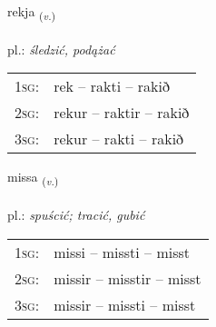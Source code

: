 \documentclass[frontgrid, backgrid]{flacards}\usepackage[]{graphicx}\usepackage[]{xcolor}
\begin{document}
\renewcommand{\flhead}{\vskip5pt \fboxsep=0pt {\small\bfseries\footnotesize Sagnorð | Verb}}
\renewcommand{\fcfoot}{\vskip5pt \fboxsep=0pt \hspace{2pt}{\small\bfseries\footnotesize 1K}}

\renewcommand{\blhead}{\vskip5pt {\small\bfseries\footnotesize Sagnorð | Verb }}
\renewcommand{\bcfoot}{\vskip5pt \hspace{2pt}{\small\bfseries\footnotesize 1K}}


{rekja \small{\textsubscript{(\textit{v.})}} \\[1ex] %
\textphonetic{[rɛːca]} \\
pl.: \emph{śledzić, podążać} \\  [2ex]
\renewcommand*{\arraystretch}{0.8}
\begin{tabular}{p{1cm}l}
\textsc{1sg}: & rek -- rakti -- rakið \\ 
\textsc{2sg}: & rekur -- raktir -- rakið \\ 
\textsc{3sg}: & rekur -- rakti -- rakið \\ 
\end{tabular}
}

\renewcommand{\flhead}{\vskip5pt \fboxsep=0pt {\small\bfseries\footnotesize Sagnorð | Verb}}
\renewcommand{\fcfoot}{\vskip5pt \fboxsep=0pt \hspace{2pt}{\small\bfseries\footnotesize 1K}}

\renewcommand{\blhead}{\vskip5pt {\small\bfseries\footnotesize Sagnorð | Verb }}
\renewcommand{\bcfoot}{\vskip5pt \hspace{2pt}{\small\bfseries\footnotesize 1K}}


{missa \small{\textsubscript{(\textit{v.})}} \\[1ex] %
\textphonetic{[mɪsa]} \\
pl.: \emph{spuścić; tracić, gubić} \\  [2ex]
\renewcommand*{\arraystretch}{0.8}
\begin{tabular}{p{1cm}l}
\textsc{1sg}: & missi -- missti -- misst \\ 
\textsc{2sg}: & missir -- misstir -- misst \\ 
\textsc{3sg}: & missir -- missti -- misst \\ 
\end{tabular}
}
\end{document}
